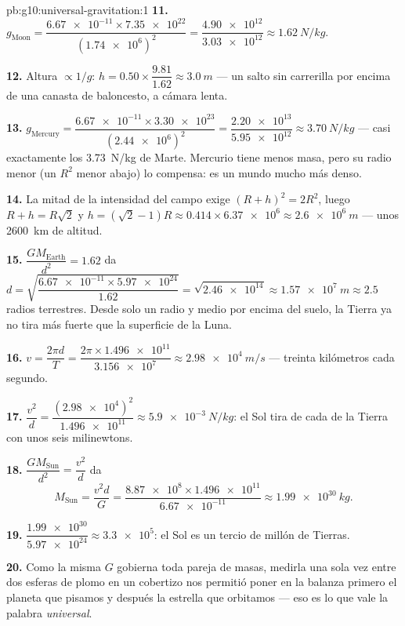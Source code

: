 \begin{solution}{pb:g10:universal-gravitation:1}
\textbf{11.} $g_{\text{Moon}} = \dfrac{\num{6.67e-11} \times
\num{7.35e22}}{(\num{1.74e6})^2} = \dfrac{\num{4.90e12}}
{\num{3.03e12}} \approx \qty{1.62}{N/kg}$.

\textbf{12.} Altura $\propto 1/g$:
$h = 0.50 \times \dfrac{9.81}{1.62} \approx \qty{3.0}{m}$ --- un salto
sin carrerilla por encima de una canasta de baloncesto, a cámara lenta.

\textbf{13.} $g_{\text{Mercury}} = \dfrac{\num{6.67e-11} \times
\num{3.30e23}}{(\num{2.44e6})^2} = \dfrac{\num{2.20e13}}
{\num{5.95e12}} \approx \qty{3.70}{N/kg}$ --- casi exactamente los
\qty{3.73}{N/kg} de Marte. Mercurio tiene menos masa, pero su radio
menor (un $R^2$ menor abajo) lo compensa: es un mundo mucho más denso.

\textbf{14.} La mitad de la intensidad del campo exige
$(R + h)^2 = 2 R^2$, luego $R + h = R\sqrt{2}$ y
$h = (\sqrt{2} - 1) R \approx 0.414 \times \num{6.37e6}
\approx \qty{2.6e6}{m}$ --- unos \qty{2600}{km} de altitud.

\textbf{15.} $\dfrac{G M_{\text{Earth}}}{d^2} = 1.62$ da
$d = \sqrt{\dfrac{\num{6.67e-11} \times \num{5.97e24}}{1.62}}
= \sqrt{\num{2.46e14}} \approx \qty{1.57e7}{m} \approx 2.5$ radios
terrestres. Desde solo un radio y medio por encima del suelo, la Tierra
ya no tira más fuerte que la superficie de la Luna.

\textbf{16.} $v = \dfrac{2\pi d}{T}
= \dfrac{2\pi \times \num{1.496e11}}{\num{3.156e7}}
\approx \qty{2.98e4}{m/s}$ --- treinta kilómetros cada segundo.

\textbf{17.} $\dfrac{v^2}{d} = \dfrac{(\num{2.98e4})^2}{\num{1.496e11}}
\approx \qty{5.9e-3}{N/kg}$: el Sol tira de cada  de la Tierra
con unos seis milinewtons.

\textbf{18.} $\dfrac{G M_{\text{Sun}}}{d^2} = \dfrac{v^2}{d}$ da
\[
M_{\text{Sun}} = \frac{v^2 d}{G}
= \frac{\num{8.87e8} \times \num{1.496e11}}{\num{6.67e-11}}
\approx \qty{1.99e30}{kg}.
\]

\textbf{19.} $\dfrac{\num{1.99e30}}{\num{5.97e24}} \approx
\num{3.3e5}$: el Sol es un tercio de millón de Tierras.

\textbf{20.} Como la misma $G$ gobierna toda pareja de masas, medirla
una sola vez entre dos esferas de plomo en un cobertizo nos permitió
poner en la balanza primero el planeta que pisamos y después la estrella
que orbitamos --- eso es lo que vale la palabra \emph{universal}.
\end{solution}
